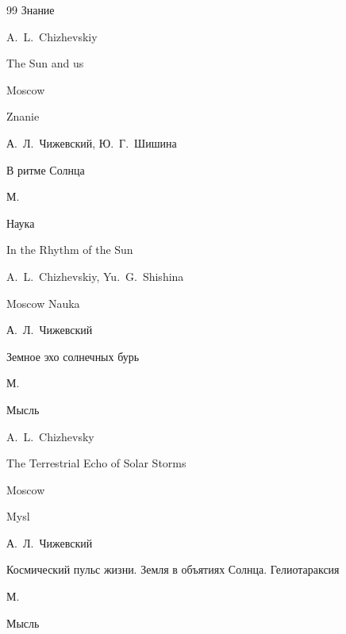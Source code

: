 \begin{thebibliography}{99}
\publ Знание



\misctransl

\by A.~L.~Chizhevskiy

\book The Sun and us

\publaddr Moscow

\publ Znanie






\by А.~Л.~Чижевский, Ю.~Г.~Шишина

\book В ритме Солнца

\publaddr М.

\publ Наука



\misctransl

\book In the Rhythm of the Sun

\by A.~L.~Chizhevskiy, Yu.~G.~Shishina 

\publaddr Moscow \publ Nauka  






\by А.~Л.~Чижевский

\book Земное эхо солнечных бурь

\publaddr М.

\publ Мысль



\misctransl

\by \by  A.~L.~Chizhevsky

\book  The Terrestrial Echo of Solar Storms

\publaddr Moscow

\publ Mysl






\by А.~Л.~Чижевский

\book Космический пульс жизни. Земля в объятиях Солнца. Гелиотараксия

\publaddr М.

\publ Мысль


\end{thebibliography}

